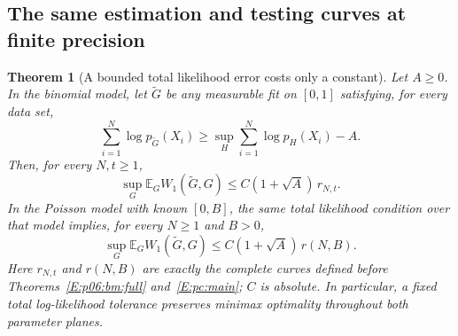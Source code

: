 \documentclass[11pt,a4paper]{article}
\newtheorem{theorem}{Theorem}[section]
\theoremstyle{definition}
\theoremstyle{remark}
\numberwithin{equation}{section}
\begin{document}
\subsection{The same estimation and testing curves at finite precision}

\begin{theorem}[A bounded total likelihood error costs only a constant]
\label{E:upst:approxrates}
Let $A\ge0$. In the binomial model, let $\widetilde G$ be any
measurable fit on $[0,1]$ satisfying, for every data set,
\[
 \sum_{i=1}^N\log p_{\widetilde G}(X_i)
 \ge\sup_H\sum_{i=1}^N\log p_H(X_i)-A.
\]
Then, for every $N,t\ge1$,
\begin{equation}\label{E:upst:binrate}
 \sup_G\mathbb E_GW_1(\widetilde G,G)
       \le C(1+\sqrt A)\,r_{N,t}.
\end{equation}
In the Poisson model with known $[0,B]$, the same total likelihood
condition over that model implies, for every $N\ge1$ and $B>0$,
\begin{equation}\label{E:upst:poirate}
 \sup_G\mathbb E_GW_1(\widetilde G,G)
       \le C(1+\sqrt A)\,r(N,B).
\end{equation}
Here $r_{N,t}$ and $r(N,B)$ are exactly the complete curves defined
before Theorems~\ref{E:p06:bm:full} and~\ref{E:pc:main}; $C$ is absolute.
In particular, a fixed total log-likelihood tolerance preserves
minimax optimality throughout both parameter planes.
\end{theorem}
\end{document}
